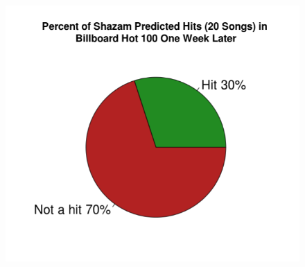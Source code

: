 \documentclass{article}
\begin{document}
\begin{figure}[hp]
  \centering
    \includegraphics[scale=0.5]{3}
\end{figure}
\end{document}
